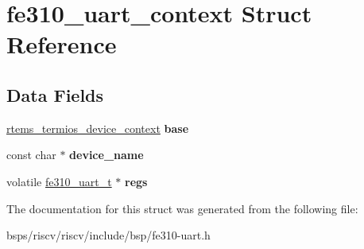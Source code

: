 \hypertarget{structfe310__uart__context}{}\section{fe310\+\_\+uart\+\_\+context Struct Reference}
\label{structfe310__uart__context}
\subsection*{Data Fields}
\begin{DoxyCompactItemize}
\item 
\mbox{\label{structfe310__uart__context_a1667d19c086636f0b544b1fb18ddbc2e}} 
\mbox{\hyperlink{structrtems__termios__device__context}{rtems\+\_\+termios\+\_\+device\+\_\+context}} {\bfseries base}
\item 
\mbox{\label{structfe310__uart__context_a6154c7ecde64b52f5ec9057146703e99}} 
const char $\ast$ {\bfseries device\+\_\+name}
\item 
\mbox{\label{structfe310__uart__context_ad2400f22066dc0efe0da38026e32fca4}} 
volatile \mbox{\hyperlink{structfe310__uart__t}{fe310\+\_\+uart\+\_\+t}} $\ast$ {\bfseries regs}
\end{DoxyCompactItemize}


The documentation for this struct was generated from the following file\+:\begin{DoxyCompactItemize}
\item 
bsps/riscv/riscv/include/bsp/fe310-\/uart.\+h\end{DoxyCompactItemize}
